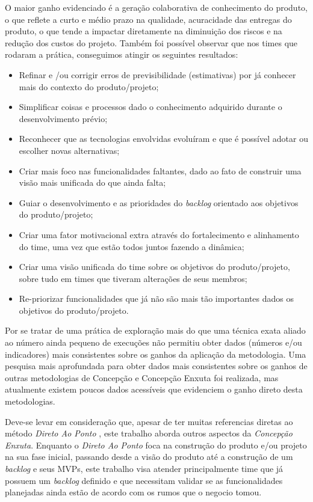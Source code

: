 \documentclass[10pt]{article}
\begin{document}
    O maior ganho evidenciado é a geração colaborativa de conhecimento do produto, o que reflete a curto e médio prazo na qualidade, acuracidade das entregas do produto, o que tende a impactar diretamente na diminuição dos riscos e na redução dos custos do projeto. Também foi possível observar que nos times que rodaram a prática, conseguimos atingir os seguintes resultados:
    \begin{itemize}
        \item Refinar e /ou corrigir erros de previsibilidade (estimativas) por já conhecer mais do contexto do produto/projeto;
        \item Simplificar coisas e processos dado o conhecimento adquirido durante o desenvolvimento prévio;
        \item Reconhecer que as tecnologias envolvidas evoluíram e que é possível adotar ou escolher novas alternativas;
        \item Criar mais foco nas funcionalidades faltantes, dado ao fato de construir uma visão mais unificada do que ainda falta;
        \item Guiar o desenvolvimento e as prioridades do \textit{backlog} orientado aos objetivos do produto/projeto;
        \item Criar uma fator motivacional extra através do fortalecimento e alinhamento do time, uma vez que estão todos juntos fazendo a dinâmica;
        \item Criar uma visão unificada do time sobre os objetivos do produto/projeto, sobre tudo em times que tiveram alterações de seus membros;
        \item Re-priorizar funcionalidades que já não são mais tão importantes dados os objetivos do produto/projeto.
    \end{itemize}
        
    Por se tratar de uma prática de exploração mais do que uma técnica exata aliado ao número ainda pequeno de execuções não permitiu obter dados (números e/ou indicadores) mais consistentes sobre os ganhos da aplicação da metodologia. Uma pesquisa mais aprofundada para obter dados mais consistentes sobre os ganhos de outras metodologias de Concepção e Concepção Enxuta foi realizada, mas atualmente existem poucos dados acessíveis que evidenciem o ganho direto desta metodologias.

    Deve-se levar em consideração que, apesar de ter muitas referencias diretas ao método \textit{Direto Ao Ponto} \cite{Caroli:DiretoAoPonto}, este trabalho aborda outros aspectos da \textit{Concepção Enxuta}. Enquanto o \textit{Direto Ao Ponto} foca na construção do produto e/ou projeto na sua fase inicial, passando desde a visão do produto até a construção de um \textit{backlog} e seus MVPs, este trabalho visa atender principalmente time que já possuem um \textit{backlog} definido e que necessitam validar se as funcionalidades planejadas ainda estão de acordo com os rumos que o negocio tomou.
    
\end{document}
